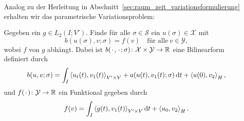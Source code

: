 Analog zu der Herleitung in Abschnitt~\ref{sec:raum_zeit_variationsformulierung} erhalten wir das parametrische Variationsproblem:

Gegeben ein $g \in L_{2}(I; V')$. Finde für alle $\sigma \in \mathcal S$ ein $u(\sigma) \in \mathcal X$ mit
\begin{equation}
    \label{eq:var_all_problem_parametrisch}
    b(u(\sigma), v; \sigma) = f(v) \quad \text{für alle}~v \in \mathcal Y,
\end{equation}
wobei $f$ von $g$ abhängt.
Dabei ist $b({\mkern2mu\cdot\mkern2mu}, {\mkern2mu\cdot\mkern2mu}; \sigma) \colon \mathcal X \times \mathcal Y \to \mathbb{R}$ eine Bilinearform definiert durch
\begin{equation}
    \label{eq:var_all_bf_b_parametrisch}
    b(u, v; \sigma) = \int_{I} \left\langle u_{t}(t),v_{1}(t)\right\rangle_{V' \times V} + a(u(t), v_{1}(t); \sigma) \mathop{}\!\mathrm{d} t + \left\langle u(0),v_{2}\right\rangle_{H},
\end{equation}
und $f({\mkern2mu\cdot\mkern2mu}) \colon \mathcal Y \to \mathbb{R}$ ein Funktional gegeben durch
\begin{equation}
    \label{eq:var_all_f_parametrisch}
    f(v) = \int_{I} \left\langle g(t),v_{1}(t)\right\rangle_{V' \times V} \mathop{}\!\mathrm{d} t + \left\langle u_{0},v_{2}\right\rangle_{H}.
\end{equation}

